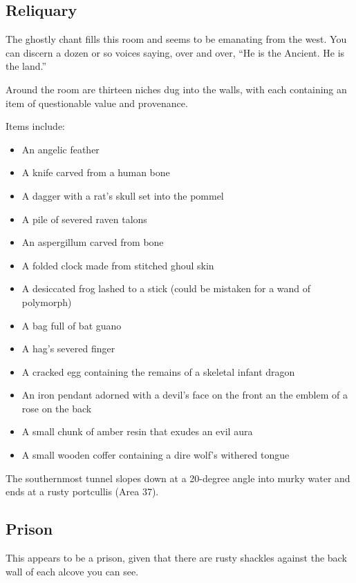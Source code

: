 \subsection{Reliquary}
\label{sec:Reliquary}
\begin{readout}
  The ghostly chant fills this room and seems to be emanating from the west. You can discern a dozen or so
  voices saying, over and over, ``He is the Ancient. He is the land.''
  
  Around the room are thirteen niches dug into the walls, with each containing an item of questionable
  value and provenance.
\end{readout}
Items include:
\begin{itemize}
  \item An angelic feather
  \item A knife carved from a human bone
  \item A dagger with a rat's skull set into the pommel
  \item A pile of severed raven talons
  \item An aspergillum carved from bone
  \item A folded clock made from stitched ghoul skin
  \item A desiccated frog lashed to a stick (could be mistaken for a wand of polymorph)
  \item A bag full of bat guano
  \item A hag's severed finger
  \item A cracked egg containing the remains of a skeletal infant dragon
  \item An iron pendant adorned with a devil's face on the front an the emblem of a rose on the back
  \item A small chunk of amber resin that exudes an evil aura
  \item A small wooden coffer containing a dire wolf's withered tongue
\end{itemize}
The southernmost tunnel slopes down at a 20-degree angle into murky water and ends at a rusty portcullis
(Area 37).

\begin{arealinks}
\end{arealinks}


\pagebreak
\subsection{Prison}
\label{sec:Prison}
\begin{readout}
  This appears to be a prison, given that there are rusty shackles against the back wall of each alcove you
  can see.
\end{readout}

